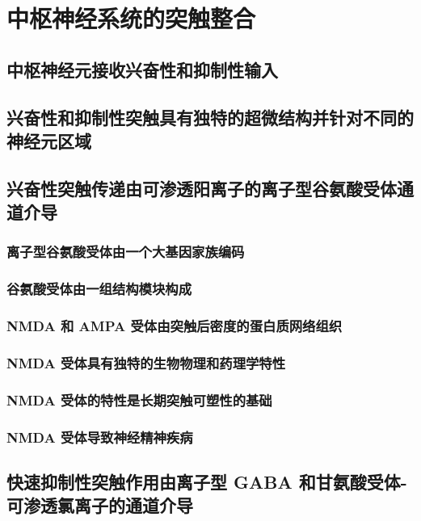 \chapter{中枢神经系统的突触整合}

\section{中枢神经元接收兴奋性和抑制性输入}

\section{兴奋性和抑制性突触具有独特的超微结构并针对不同的神经元区域}

\section{兴奋性突触传递由可渗透阳离子的离子型谷氨酸受体通道介导}
\subsection{离子型谷氨酸受体由一个大基因家族编码}
\subsection{谷氨酸受体由一组结构模块构成}
\subsection{NMDA 和 AMPA 受体由突触后密度的蛋白质网络组织}
\subsection{NMDA 受体具有独特的生物物理和药理学特性}
\subsection{NMDA 受体的特性是长期突触可塑性的基础}
\subsection{NMDA 受体导致神经精神疾病}

\section{快速抑制性突触作用由离子型 GABA 和甘氨酸受体-可渗透氯离子的通道介导}
